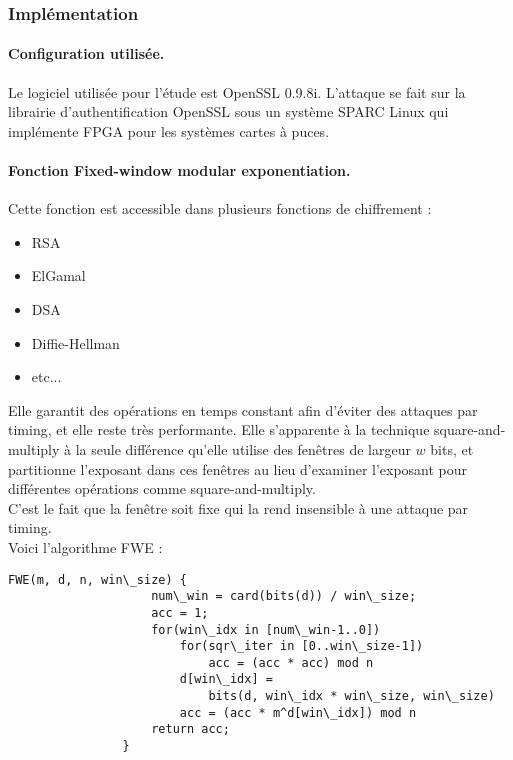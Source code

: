 		
		\subsubsection{Implémentation}
			
			\paragraph{Configuration utilisée.\\}
			
			Le logiciel utilisée pour l'étude est OpenSSL 0.9.8i. L'attaque se fait sur la librairie d'authentification OpenSSL sous un système SPARC Linux qui implémente FPGA pour les systèmes cartes à puces.

			\paragraph{Fonction Fixed-window modular exponentiation.\\}

			Cette fonction est accessible dans plusieurs fonctions de chiffrement :
			\begin{itemize}
			\item RSA
			\item ElGamal
			\item DSA
			\item Diffie-Hellman
			\item etc...
			\end{itemize}
		
			Elle garantit des opérations en temps constant afin d'éviter des attaques par timing, et elle reste très performante. Elle s'apparente à la technique square-and-multiply à la seule différence qu'elle utilise des fenêtres de largeur $w$ bits, et partitionne l'exposant dans ces fenêtres au lieu d'examiner l'exposant pour différentes opérations comme square-and-multiply. \\

			C'est le fait que la fenêtre soit fixe qui la rend insensible à une attaque par timing.\\

			Voici l'algorithme FWE :
		
			\begin{lstlisting}[style=customc,caption=fwe.c, label=fwe]
				FWE(m, d, n, win\_size) {
					num\_win = card(bits(d)) / win\_size;
					acc = 1;
					for(win\_idx in [num\_win-1..0])
						for(sqr\_iter in [0..win\_size-1])
							acc = (acc * acc) mod n
						d[win\_idx] =
							bits(d, win\_idx * win\_size, win\_size)
						acc = (acc * m^d[win\_idx]) mod n
					return acc;
				}
			\end{lstlisting}
		


